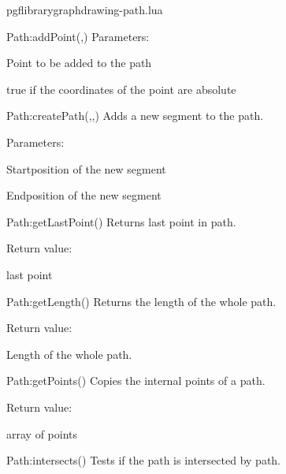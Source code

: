 \begin{filedescription}{pgflibrarygraphdrawing-path.lua}
\begin{luacommand}{{Path:addPoint}(,)}
Parameters:
\begin{parameterdescription}
	\item[\meta{point}] Point to be added to the path\item[\meta{keepAbsPosition}] true if the coordinates of the point are absolute
\end{parameterdescription}



\end{luacommand}
\begin{luacommand}{{Path:createPath}(,,)}
Adds a new segment to the path.

Parameters:
\begin{parameterdescription}
	\item[\meta{posStart}] Startposition of the new segment\item[\meta{posEnd}] Endposition of the new segment
\end{parameterdescription}



\end{luacommand}
\begin{luacommand}{{Path:getLastPoint}()}
Returns last point in path.


Return value:
\begin{parameterdescription} 
  \item[] last point
\end{parameterdescription}


\end{luacommand}
\begin{luacommand}{{Path:getLength}()}
Returns the length of the whole path.


Return value:
\begin{parameterdescription} 
  \item[] Length of the whole path.
\end{parameterdescription}


\end{luacommand}
\begin{luacommand}{{Path:getPoints}()}
Copies the internal points of a path.


Return value:
\begin{parameterdescription} 
  \item[] array of points
\end{parameterdescription}


\end{luacommand}
\begin{luacommand}{{Path:intersects}()}
Tests if the path is intersected by path.


\end{luacommand}
\end{filedescription}
